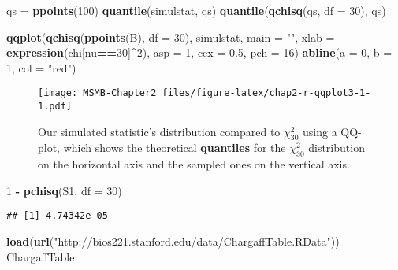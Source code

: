 \documentclass[]{article}
\newenvironment{Shaded}{\begin{snugshade}}{\end{snugshade}}
\newcommand{\KeywordTok}[1]{\textcolor[rgb]{0.13,0.29,0.53}{\textbf{#1}}}
\newcommand{\DataTypeTok}[1]{\textcolor[rgb]{0.13,0.29,0.53}{#1}}
\newcommand{\DecValTok}[1]{\textcolor[rgb]{0.00,0.00,0.81}{#1}}
\newcommand{\FloatTok}[1]{\textcolor[rgb]{0.00,0.00,0.81}{#1}}
\newcommand{\StringTok}[1]{\textcolor[rgb]{0.31,0.60,0.02}{#1}}
\newcommand{\OperatorTok}[1]{\textcolor[rgb]{0.81,0.36,0.00}{\textbf{#1}}}
\newcommand{\NormalTok}[1]{#1}
\begin{document}
\begin{Shaded}
\begin{Highlighting}[]
\NormalTok{qs =}\StringTok{ }\KeywordTok{ppoints}\NormalTok{(}\DecValTok{100}\NormalTok{)}
\KeywordTok{quantile}\NormalTok{(simulstat, qs)}
\KeywordTok{quantile}\NormalTok{(}\KeywordTok{qchisq}\NormalTok{(qs, }\DataTypeTok{df =} \DecValTok{30}\NormalTok{), qs)}
\end{Highlighting}
\end{Shaded}

\begin{Shaded}
\begin{Highlighting}[]
\KeywordTok{qqplot}\NormalTok{(}\KeywordTok{qchisq}\NormalTok{(}\KeywordTok{ppoints}\NormalTok{(B), }\DataTypeTok{df =} \DecValTok{30}\NormalTok{), simulstat, }\DataTypeTok{main =} \StringTok{""}\NormalTok{,}
       \DataTypeTok{xlab =} \KeywordTok{expression}\NormalTok{(chi[nu}\OperatorTok{==}\DecValTok{30}\NormalTok{]}\OperatorTok{^}\DecValTok{2}\NormalTok{), }\DataTypeTok{asp =} \DecValTok{1}\NormalTok{, }\DataTypeTok{cex =} \FloatTok{0.5}\NormalTok{, }\DataTypeTok{pch =} \DecValTok{16}\NormalTok{)}
\KeywordTok{abline}\NormalTok{(}\DataTypeTok{a =} \DecValTok{0}\NormalTok{, }\DataTypeTok{b =} \DecValTok{1}\NormalTok{, }\DataTypeTok{col =} \StringTok{"red"}\NormalTok{)}
\end{Highlighting}
\end{Shaded}

\begin{figure}
\centering
\texttt{[image: MSMB-Chapter2\_files/figure-latex/chap2-r-qqplot3-1-1.pdf]}
\caption{Our simulated statistic's distribution compared to
\(\chi_{30}^2\) using a QQ-plot, which shows the theoretical
\textbf{quantiles} for the \(\chi^2_{30}\) distribution on the
horizontal axis and the sampled ones on the vertical axis.}
\end{figure}

\begin{Shaded}
\begin{Highlighting}[]
\DecValTok{1} \OperatorTok{-}\StringTok{ }\KeywordTok{pchisq}\NormalTok{(S1, }\DataTypeTok{df =} \DecValTok{30}\NormalTok{)}
\end{Highlighting}
\end{Shaded}

\begin{verbatim}
## [1] 4.74342e-05
\end{verbatim}

\begin{Shaded}
\begin{Highlighting}[]
\KeywordTok{load}\NormalTok{(}\KeywordTok{url}\NormalTok{(}\StringTok{"http://bios221.stanford.edu/data/ChargaffTable.RData"}\NormalTok{))}
\NormalTok{ChargaffTable}
\end{Highlighting}
\end{Shaded}
\end{document}
